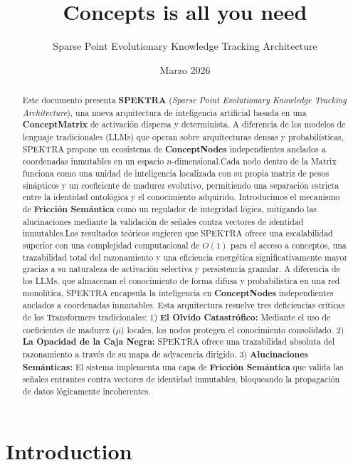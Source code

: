 \documentclass[12pt]{article}
\title{\textbf{Concepts is all you need} }
\author{Sparse Point Evolutionary Knowledge Tracking Architecture}
\date{Marzo 2026}
\begin{document}
\maketitle

\begin{abstract}Este documento presenta \textbf{SPEKTRA} (\textit{Sparse Point Evolutionary Knowledge Tracking Architecture}), una nueva arquitectura de inteligencia artificial basada en una \textbf{ConceptMatrix} de activación dispersa y determinista. A diferencia de los modelos de lenguaje tradicionales (LLMs) que operan sobre arquitecturas densas y probabilísticas, SPEKTRA propone un ecosistema de \textbf{ConceptNodes} independientes anclados a coordenadas inmutables en un espacio $n$-dimensional.Cada nodo dentro de la Matrix funciona como una unidad de inteligencia localizada con su propia matriz de pesos sinápticos y un coeficiente de madurez evolutivo, permitiendo una separación estricta entre la identidad ontológica y el conocimiento adquirido. Introducimos el mecanismo de \textbf{Fricción Semántica} como un regulador de integridad lógica, mitigando las alucinaciones mediante la validación de señales contra vectores de identidad inmutables.Los resultados teóricos sugieren que SPEKTRA ofrece una escalabilidad superior con una complejidad computacional de $O(1)$ para el acceso a conceptos, una trazabilidad total del razonamiento y una eficiencia energética significativamente mayor gracias a su naturaleza de activación selectiva y persistencia granular. 
A diferencia de los LLMs, que almacenan el conocimiento de forma difusa y probabilística en una red monolítica, SPEKTRA encapsula la inteligencia en \textbf{ConceptNodes} independientes anclados a coordenadas inmutables. Esta arquitectura resuelve tres deficiencias críticas de los Transformers tradicionales: 
1) \textbf{El Olvido Catastrófico:} Mediante el uso de coeficientes de madurez ($\mu$) locales, los nodos protegen el conocimiento consolidado. 
2) \textbf{La Opacidad de la Caja Negra:} SPEKTRA ofrece una trazabilidad absoluta del razonamiento a través de su mapa de adyacencia dirigido. 
3) \textbf{Alucinaciones Semánticas:} El sistema implementa una capa de \textbf{Fricción Semántica} que valida las señales entrantes contra vectores de identidad inmutables, bloqueando la propagación de datos lógicamente incoherentes.
\end{abstract}


\section{Introduction}
\end{document}
